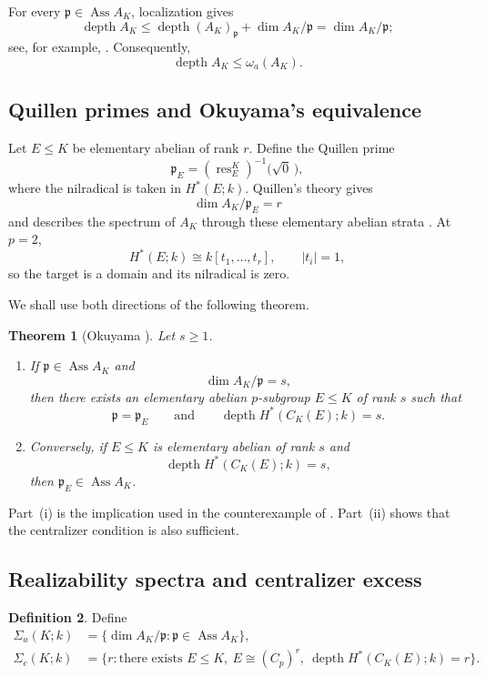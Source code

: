 \documentclass[11pt]{amsart}
\newtheorem{theorem}{Theorem}[section]
\theoremstyle{definition}
\newtheorem{definition}[theorem]{Definition}
\theoremstyle{remark}
\DeclareMathOperator{\depth}{depth}
\DeclareMathOperator{\Ass}{Ass}
\DeclareMathOperator{\res}{res}
\begin{document}
For every $\mathfrak p\in\Ass A_K$, localization gives
\[
\depth A_K\leq \depth (A_K)_{\mathfrak p}+\dim A_K/\mathfrak p
=\dim A_K/\mathfrak p;
\]
see, for example, \cite{BrunsHerzog,Eisenbud}.  Consequently,
\begin{equation}
\label{eq:standard-ineq}
\depth A_K\leq\omega_a(A_K).
\end{equation}

\subsection{Quillen primes and Okuyama's equivalence}

Let $E\leq K$ be elementary abelian of rank $r$.  Define the Quillen prime
\[
\mathfrak p_E=(\res^K_E)^{-1}\bigl(\sqrt{0}\,\bigr),
\]
where the nilradical is taken in $H^*(E;k)$.  Quillen's theory gives
\[
\dim A_K/\mathfrak p_E=r
\]
and describes the spectrum of $A_K$ through these elementary abelian strata \cite{QuillenI,QuillenII}.  At $p=2$,
\[
H^*(E;k)\cong k[t_1,\dots,t_r],
\qquad |t_i|=1,
\]
so the target is a domain and its nilradical is zero.

We shall use both directions of the following theorem.

\begin{theorem}[Okuyama \cite{Okuyama2010}]
\label{thm:okuyama}
Let $s\geq1$.
\begin{enumerate}[label=\textup{(\roman*)}]
\item If $\mathfrak p\in\Ass A_K$ and
\[
\dim A_K/\mathfrak p=s,
\]
then there exists an elementary abelian $p$-subgroup $E\leq K$ of rank $s$ such that
\[
\mathfrak p=\mathfrak p_E
\qquad\text{and}\qquad
\depth H^*(C_K(E);k)=s.
\]
\item Conversely, if $E\leq K$ is elementary abelian of rank $s$ and
\[
\depth H^*(C_K(E);k)=s,
\]
then $\mathfrak p_E\in\Ass A_K$.
\end{enumerate}
\end{theorem}

Part~(i) is the implication used in the counterexample of \cite{DaiEtAl2026}.  Part~(ii) shows that the centralizer condition is also sufficient.

\subsection{Realizability spectra and centralizer excess}

\begin{definition}
Define
\begin{align*}
\Sigma_a(K;k)
&=\{\dim A_K/\mathfrak p:\mathfrak p\in\Ass A_K\},\\
\Sigma_c(K;k)
&=\{r:\text{there exists }E\leq K,
\ E\cong(C_p)^r,
\ \depth H^*(C_K(E);k)=r\}.
\end{align*}
\end{definition}
\end{document}
